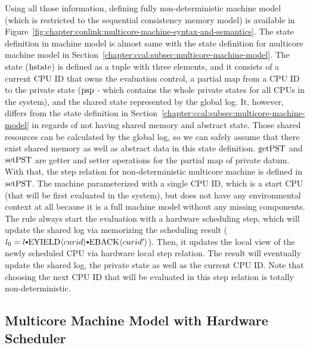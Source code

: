 Using all those information, defining fully non-deterministic machine model (which is restricted to the sequential consistency memory model) 
is available in Figure~\ref{fig:chapter:conlink:multicore-machine-syntax-and-semantics}.
The state definition in machine model is almost same with the state definition for multicore machine model  in Section~\ref{chapter:ccal:subsec:multicore-machine-model}. 
The state (${\mathrm{hstate}}$) is defined as a tuple with three elements, and it consists of a current CPU ID that owns the evaluation control,
a partial map from a CPU ID to the private state (${\mathrm{psp}}$ - which contains the whole private states for all CPUs in the system),
and the shared state represented by the global log. 
It, however, differs from the state definition in Section~\ref{chapter:ccal:subsec:multicore-machine-model} 
in regards of not having shared memory and abstract state. 
Those shared resources can be calculated by the global log, so we can safely assume that 
there exist shared memory as well as abstract data in this state definition. 
${\mathrm{getPST}}$ and ${\mathrm{setPST}}$ are getter and setter operations for the partial map of private datum. 
With that, 
the step relation for non-deterministic multicore machine is defined in ${\mathrm{setPST}}$. 
The machine parameterized with a single CPU ID, which is a start CPU (that will be first evaluated in the system),
but does not have any environmental context at all because it is a full machine model without any missing components. 
The rule always start the evaluation 
with a hardware scheduling step, which will update the shared log via memorizing 
the scheduling result ($l_0 = \listconsoppo{\yieldbackev{curid'}}{\listconsoppo{\yieldev{curid}}{l}}$). 
Then, 
it updates the local view of the newly scheduled CPU via hardware local step relation. 
The result will eventually update the shared log, the private state as well as the current CPU ID. 
Note that choosing the next CPU ID that will be evaluated in this step relation is totally non-deterministic.




\subsection{Multicore Machine Model with Hardware Scheduler}
\label{chapter:linking:subsec:multicore-machine-model-with-hardware-scheduler}


